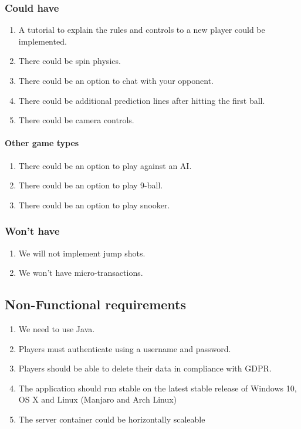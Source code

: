 \documentclass[10pt]{article}
\begin{document}
		\subsubsection{Could have}
			\begin{enumerate}[resume]
				\item A tutorial to explain the rules and controls to a new player could be implemented.
				\item There could be spin physics.
				\item There could be an option to chat with your opponent.
				\item There could be additional prediction lines after hitting the first ball.
				\item There could be camera controls.
			\end{enumerate}

			\paragraph{Other game types}
				\begin{enumerate}[resume]
					\item There could be an option to play against an AI.
					\item There could be an option to play 9-ball.
					\item There could be an option to play snooker.
				\end{enumerate}

		\subsubsection{Won't have}
			\begin{enumerate}[resume]
				\item We will not implement jump shots.
				\item We won't have micro-transactions.
			\end{enumerate}
	\pagebreak
	\subsection{Non-Functional requirements}
		\begin{enumerate}
			\item We need to use Java.
			\item Players must authenticate using a username and password.
			\item Players should be able to delete their data in compliance with GDPR.
			\item The application should run stable on the latest stable release of Windows 10, OS X and Linux (Manjaro and Arch Linux)
			\item The server container could be horizontally scaleable
		\end{enumerate}
\end{document}

